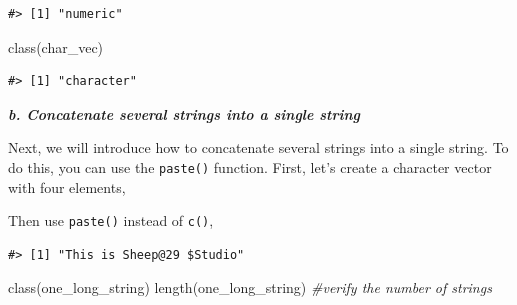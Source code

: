 \documentclass[
]{book}
\newenvironment{Shaded}{\begin{snugshade}}{\end{snugshade}}
\newcommand{\CommentTok}[1]{\textcolor[rgb]{0.56,0.35,0.01}{\textit{#1}}}
\newcommand{\FunctionTok}[1]{\textcolor[rgb]{0.00,0.00,0.00}{#1}}
\newcommand{\NormalTok}[1]{#1}
\newcommand{\OtherTok}[1]{\textcolor[rgb]{0.56,0.35,0.01}{#1}}
\newcommand{\StringTok}[1]{\textcolor[rgb]{0.31,0.60,0.02}{#1}}
\begin{document}
\begin{verbatim}
#> [1] "numeric"
\end{verbatim}

\begin{Shaded}
\begin{Highlighting}[]
\FunctionTok{class}\NormalTok{(char\_vec)}
\end{Highlighting}
\end{Shaded}

\begin{verbatim}
#> [1] "character"
\end{verbatim}

\textbf{\emph{b. Concatenate several strings into a single string}}

Next, we will introduce how to concatenate several strings into a single string. To do this, you can use the \texttt{paste()} function. First, let's create a character vector with four elements,

\begin{Shaded}
\end{Shaded}

Then use \texttt{paste()} instead of \texttt{c()},

\begin{Shaded}
\end{Shaded}

\begin{verbatim}
#> [1] "This is Sheep@29 $Studio"
\end{verbatim}

\begin{Shaded}
\begin{Highlighting}[]
\FunctionTok{class}\NormalTok{(one\_long\_string)}
\FunctionTok{length}\NormalTok{(one\_long\_string) }\CommentTok{\#verify the number of strings}
\end{Highlighting}
\end{Shaded}
\end{document}
